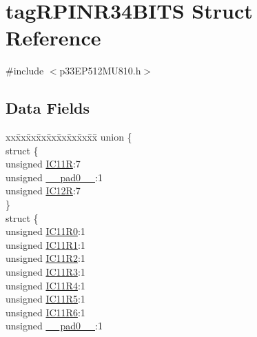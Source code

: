 \hypertarget{structtag_r_p_i_n_r34_b_i_t_s}{}\section{tag\+R\+P\+I\+N\+R34\+B\+I\+TS Struct Reference}
\label{structtag_r_p_i_n_r34_b_i_t_s}


{\ttfamily \#include $<$p33\+E\+P512\+M\+U810.\+h$>$}

\subsection*{Data Fields}
\begin{DoxyCompactItemize}
\item 
\begin{tabbing}
xx\=xx\=xx\=xx\=xx\=xx\=xx\=xx\=xx\=\kill
union \{\\
\>struct \{\\
\>\>unsigned \hyperlink{structtag_r_p_i_n_r34_b_i_t_s_a03698fa8b563693b71733f56df7726c3}{IC11R}:7\\
\>\>unsigned \hyperlink{structtag_r_p_i_n_r34_b_i_t_s_adf71f3d8410c1f1dbbc96680a92c49af}{\_\_pad0\_\_}:1\\
\>\>unsigned \hyperlink{structtag_r_p_i_n_r34_b_i_t_s_a5cb08b92995b3cab64b99462b869c32d}{IC12R}:7\\
\>\} \\
\>struct \{\\
\>\>unsigned \hyperlink{structtag_r_p_i_n_r34_b_i_t_s_aca231aa9caf9c8c0a32e7497820fff48}{IC11R0}:1\\
\>\>unsigned \hyperlink{structtag_r_p_i_n_r34_b_i_t_s_a6ebef071890206d63ed4de1156f56f6d}{IC11R1}:1\\
\>\>unsigned \hyperlink{structtag_r_p_i_n_r34_b_i_t_s_ab24e330687e407c49fe642eaf3860b9b}{IC11R2}:1\\
\>\>unsigned \hyperlink{structtag_r_p_i_n_r34_b_i_t_s_acebecfa1632d01df9f3ac8357748be8c}{IC11R3}:1\\
\>\>unsigned \hyperlink{structtag_r_p_i_n_r34_b_i_t_s_a8316d21d3d664433ec95274bfe893648}{IC11R4}:1\\
\>\>unsigned \hyperlink{structtag_r_p_i_n_r34_b_i_t_s_a6dac6d7c0a0d54e79bbf8734b3c6a832}{IC11R5}:1\\
\>\>unsigned \hyperlink{structtag_r_p_i_n_r34_b_i_t_s_a9043e8a473c567a68222d98785785627}{IC11R6}:1\\
\>\>unsigned \hyperlink{structtag_r_p_i_n_r34_b_i_t_s_adf71f3d8410c1f1dbbc96680a92c49af}{\_\_pad0\_\_}:1\\

\end{tabbing}
\end{DoxyCompactItemize}
